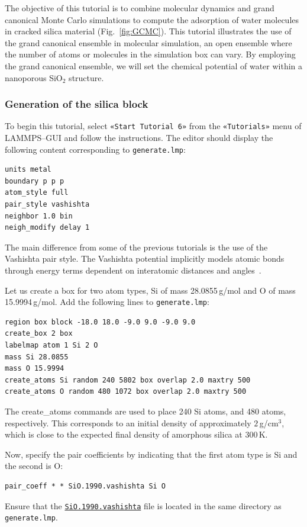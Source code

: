 \documentclass[9pt,tutorial]{livecoms}
\newcommand{\lmpcmd}[1]{\hspace{0pt}\colorbox{listing}{\textcolor{command}{\small{#1}}}\hspace{0pt}} %
\newcommand{\flecmd}[1]{\textcolor{command}{\texttt{#1}}} %
\newcommand{\guicmd}[1]{\textcolor{command}{\texttt{«#1»}}} %
\newcommand{\dwlcmd}[1]{\textcolor{download}{\texttt{#1}}} %
\newcommand{\filepath}{https://raw.githubusercontent.com/lammpstutorials/lammpstutorials-article/main/files/}
\begin{document}
\noindent The objective of this tutorial is to combine molecular dynamics and
grand canonical Monte Carlo simulations to compute the adsorption of water
molecules in cracked silica material (Fig.~\ref{fig:GCMC}).  This tutorial
illustrates the use of the grand canonical ensemble in molecular simulation, an
open ensemble where the number of atoms or molecules in the simulation box can vary.
By employing the grand canonical ensemble, we will set the chemical
potential of water within a nanoporous SiO$_2$ structure.

\subsubsection{Generation of the silica block}

\noindent To begin this tutorial, select \guicmd{Start Tutorial 6} from the
\guicmd{Tutorials} menu of LAMMPS--GUI and follow the instructions.
The editor should display the following content corresponding to \flecmd{generate.lmp}:
\begin{lstlisting}
units metal
boundary p p p
atom_style full
pair_style vashishta
neighbor 1.0 bin
neigh_modify delay 1
\end{lstlisting}
The main difference from some of the previous tutorials is the use of the \lmpcmd{Vashishta}
pair style.  The Vashishta potential implicitly models atomic bonds through
energy terms dependent on interatomic distances and angles~\cite{vashishta1990interaction}.

Let us create a box for two atom types, \lmpcmd{Si}
of mass 28.0855\,g/mol and \lmpcmd{O} of mass 15.9994\,g/mol.
Add the following lines to \flecmd{generate.lmp}:
\begin{lstlisting}
region box block -18.0 18.0 -9.0 9.0 -9.0 9.0
create_box 2 box
labelmap atom 1 Si 2 O
mass Si 28.0855
mass O 15.9994
create_atoms Si random 240 5802 box overlap 2.0 maxtry 500
create_atoms O random 480 1072 box overlap 2.0 maxtry 500
\end{lstlisting}
The \lmpcmd{create\_atoms} commands are used to place
240 Si atoms, and 480 atoms, respectively.  This corresponds to
an initial density of approximately $2$\,g/cm$^3$, which is close
to the expected final density of amorphous silica at 300\,K.

Now, specify the pair coefficients by indicating that the first atom type
is \lmpcmd{Si} and the second is \lmpcmd{O}:
\begin{lstlisting}
pair_coeff * * SiO.1990.vashishta Si O
\end{lstlisting}
Ensure that the \href{\filepath tutorial6/SiO.1990.vashishta}{\dwlcmd{SiO.1990.vashishta}}
file is located in the same directory as \flecmd{generate.lmp}.
\end{document}
